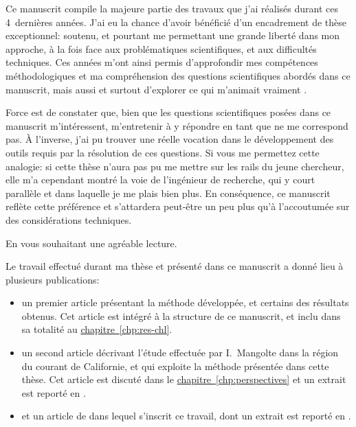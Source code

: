 Ce manuscrit compile la majeure partie des travaux que j'ai réalisés durant ces 4~dernières années.
J'ai eu la chance d'avoir bénéficié d'un encadrement de thèse exceptionnel: soutenu, et pourtant me permettant une grande liberté dans mon approche, à la fois face aux problématiques scientifiques, et aux difficultés techniques.
Ces années m'ont ainsi permis d'approfondir mes compétences méthodologiques et ma compréhension des questions scientifiques abordés dans ce manuscrit, mais aussi et surtout d'explorer ce qui m'animait vraiment .

Force est de constater que, bien que les questions scientifiques posées dans ce manuscrit m'intéressent, m'entretenir à y répondre en tant que  ne me correspond pas.
À l'inverse, j'ai pu trouver une réelle vocation dans le développement des outils requis par la résolution de ces questions.
Si vous me permettez cette analogie: si cette thèse n'aura pas pu me mettre sur les rails du jeune chercheur, elle m'a cependant montré la voie de l'ingénieur de recherche, qui y court parallèle et dans laquelle je me plais bien plus.
En conséquence, ce manuscrit reflète cette préférence et s'attardera peut-être un peu plus qu'à l'accoutumée sur des considérations techniques.

En vous souhaitant une agréable lecture.

\clearpage
\thispagestyle{thesis-empty}

\label{sec:productions}

\begingroup
{}
Le travail effectué durant ma thèse et présenté dans ce manuscrit a donné lieu à plusieurs publications:
\begin{itemize}
  \setlength{\itemsep}{2\baselineskip}
  \renewcommand*\labelitemi{\adfrightarrowhead}
  \item un premier article présentant la méthode développée, et certains des résultats obtenus.
        Cet article est intégré à la structure de ce manuscrit, et inclu dans sa totalité au \hyperref[sec:article-bg]{chapitre~\ref*{chp:res-chl}}.

  \item un second article décrivant l'étude effectuée par I.\ Mangolte dans la région du courant de Californie, et qui exploite la méthode présentée dans cette thèse. Cet article est discuté dans le \hyperref[sec:cce]{chapitre~\ref*{chp:perspectives}} et un extrait est reporté en .

  \item et un article de  dans lequel s’inscrit ce travail,
        dont un extrait est reporté en .

\end{itemize}
\endgroup

